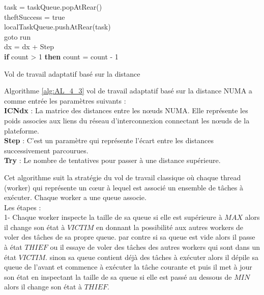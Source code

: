 \begin{algorithm}
{{{{			task = taskQueue.popAtRear()\\
			 {
				theftSuccess = true \\
				localTaskQueue.pushAtRear(task)\\
				goto run\\
			}
		}
		dx = dx + Step\\   %
		\textbf{if } count > 1 \textbf{ then } count = count - 1
	}
}
}
\label{alg:AL_4_3}
\caption{Vol de travail adaptatif basé sur la distance}
\end{algorithm}              %
Algorithme \ref{alg:AL_4_3} vol de travail adaptatif basé sur la distance NUMA a comme entrée les paramètres suivants : \\
\textbf{ICNdx} : La matrice des distances entre les nœuds NUMA. Elle représente les poids associes aux liens du réseau d'interconnexion connectant les nœuds de la plateforme.\\
\textbf{Step} :  C'est un paramètre qui représente l'écart entre les distances successivement  parcourues.\\
\textbf{Try} : Le nombre de tentatives pour passer à une distance supérieure.

Cet algorithme suit la stratégie du vol de travail classique où chaque thread (worker) qui représente un cœur à lequel est associé un ensemble de tâches à exécuter. Chaque worker a une queue associe.\\ 
Les étapes :\\
1- Chaque worker inspecte la taille de sa queue 
si elle est supérieure à $MAX$ alors il change son état à $VICTIM$ en donnant la possibilité aux autres workers de voler des tâches de sa propre queue.
par contre si sa queue est vide alors il passe à état $THIEF$ ou il essaye de voler des tâches des autres workers qui sont dans un état $VICTIM$.
sinon sa queue contient déjà des tâches à exécuter alors il dépile sa queue de l'avant et commence à exécuter la tâche courante et puis il met à jour son état en inspectant la taille de sa queue si elle est passé au dessous de $MIN$ alors il change son état à $THIEF$.

